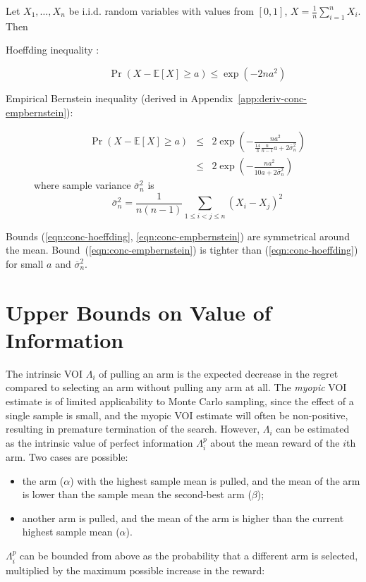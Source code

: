 \documentclass{article}
\newcommand {\IE} {\ensuremath {\mathbb{E}}}
\begin{document}
Let $X_1, \ldots, X_n$ be i.i.d. random variables with values from $[0,1]$,
$X=\frac 1 n \sum_{i=1}^n X_i$. Then 
\begin{description}
\item[Hoeffding inequality \rm{\cite{Hoeffding.ineq}}:] 
\begin{equation}
\Pr(X-\IE[X] \ge a) \le \exp ( -2na^2)
\label{eqn:conc-hoeffding}
\end{equation}
\item[Empirical Bernstein inequality
  \rm{\cite{MaurerPontil.benrstein}} \textrm{(derived in Appendix~\ref{app:deriv-conc-empbernstein})}:]
\begin{eqnarray}
\Pr(X-\IE[X] \ge a) &\le& 2\exp \left( - \frac {na^2} {\frac {14} {3}
                          \frac {n} {n-1}a+2\overline\sigma_n^2}\right)\nonumber\\
                    &\le& 2\exp \left( - \frac {na^2} {10a+2\overline\sigma_n^2}\right)
\label{eqn:conc-empbernstein}
\end{eqnarray}
where sample variance $\overline\sigma_n^2$ is
\begin{equation}
\overline\sigma_n^2=\frac 1 {n(n-1)} \sum_{1\le i < j\le n}(X_i-X_j)^2
\label{eqn:sample-variance}
\end{equation}
\end{description}
Bounds (\ref{eqn:conc-hoeffding}, \ref{eqn:conc-empbernstein}) are symmetrical
around the mean. Bound~(\ref{eqn:conc-empbernstein}) is tighter than
(\ref{eqn:conc-hoeffding}) for small $a$ and $\overline\sigma_n^2$. 

\section{Upper Bounds on Value of Information}

The intrinsic VOI $\Lambda_i$ of pulling an arm is the expected decrease
in the regret compared to selecting an arm without pulling any arm at
all. The \textit{myopic} VOI estimate is of limited applicability to
Monte Carlo sampling, since the effect of a single sample is small,
and the myopic VOI estimate will often be non-positive, resulting in premature
termination of the search. However, $\Lambda_i$ can be estimated as the intrinsic 
value of perfect information $\Lambda_i^p$ about the mean reward of the $i$th arm. Two
cases are possible:
\begin{itemize}
\item the arm ($\alpha$) with the highest sample mean is pulled, and the 
mean of the arm is lower than the sample mean the second-best arm ($\beta$);
\item another arm is pulled, and the mean of the arm is higher
than the current highest sample mean ($\alpha$).
\end{itemize}
$\Lambda_i^p$ can be bounded from above as the probability that a
different arm is selected, multiplied by the
maximum possible increase in the reward:
\end{document}
